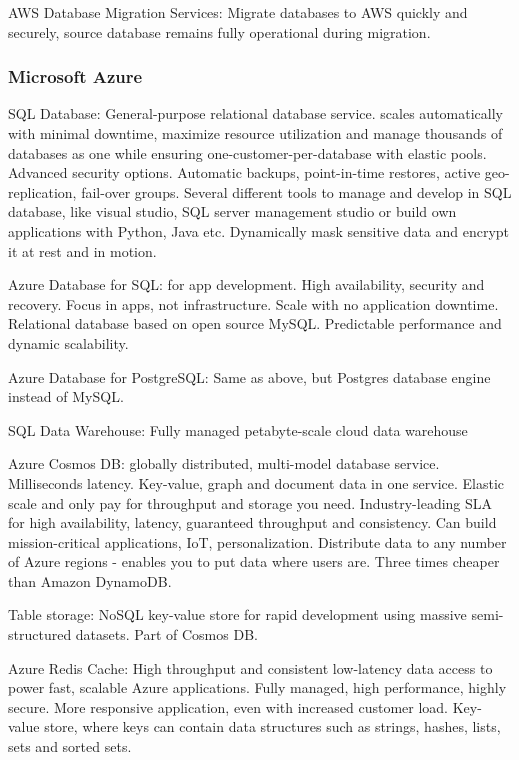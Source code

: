 AWS Database Migration Services: Migrate databases to AWS quickly and securely, source database remains fully operational during migration. 


\subsubsection{Microsoft Azure}

SQL Database: General-purpose relational database service. scales automatically with minimal downtime, maximize resource utilization and manage thousands of databases as one while ensuring one-customer-per-database with elastic pools. Advanced security options. Automatic backups, point-in-time restores, active geo-replication, fail-over groups. Several different tools to manage and develop in SQL database, like visual studio, SQL server management studio or build own applications with Python, Java etc. Dynamically mask sensitive data and encrypt it at rest and in motion. 

Azure Database for SQL: for app development. High availability, security and recovery. Focus in apps, not infrastructure. Scale with no application downtime. Relational database based on open source MySQL. Predictable performance and dynamic scalability. 

Azure Database for PostgreSQL: Same as above, but Postgres database engine instead of MySQL.

SQL Data Warehouse: Fully managed petabyte-scale cloud data warehouse

Azure Cosmos DB: globally distributed, multi-model database service. Milliseconds latency. Key-value, graph and document data in one service. Elastic scale and only pay for throughput and storage you need. Industry-leading SLA for high availability, latency, guaranteed throughput and consistency. Can build mission-critical applications, IoT, personalization. Distribute data to any number of Azure regions - enables you to put data where users are. Three times cheaper than Amazon DynamoDB. 

Table storage: NoSQL key-value store for rapid development using massive semi-structured datasets. Part of Cosmos DB. 

Azure Redis Cache: High throughput and consistent low-latency data access to power fast, scalable Azure applications. Fully managed, high performance, highly secure. More responsive application, even with increased customer load. Key-value store, where keys can contain data structures such as strings, hashes, lists, sets and sorted sets. 

